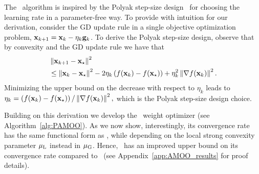The \PAMOO\ algorithm is inspired by the Polyak step-size design~\cite{polyak1987introduction, hazan2019revisiting} for choosing the learning rate in a parameter-free way. To provide with intuition for our derivation, consider the GD update rule in a single objective optimization problem, ${\mathbf{x}}_{k+1}={\mathbf{x}}_k-\eta_k {\mathbf{g}}_k$. To derive the Polyak step-size design, observe that by convexity and the GD update rule we have that
\begin{align}
    &\left\Vert{\mathbf{x}}_{k+1}-{\mathbf{x}}_\star\right\Vert^2 \label{eq:polyak standard main paper}\\
    &\leq \left\Vert{\mathbf{x}}_{k}-{\mathbf{x}}_\star\right\Vert^2 -2 \eta_k \left(f({\mathbf{x}}_k)-f({\mathbf{x}}_\star)\right) + \eta_k^2\left\Vert\nabla f({\mathbf{x}}_k)\right\Vert^2. \nonumber
\end{align}
Minimizing the upper bound on the decrease with respect to $\eta_k$ leads to $\eta_k = \left(f({\mathbf{x}}_k)-f({\mathbf{x}}_\star)\right)/\left\Vert\nabla f({\mathbf{x}}_k)\right\Vert^2,$ which is the Polyak step-size design choice. 

 Building on this derivation we develop the \PAMOO\ weight optimizer (see Algorithm~\ref{alg:PAMOO}). As we now show, interestingly, its convergence rate has the same functional form as \CAMOO, while depending on the local strong convexity parameter ${\mu_{\mathrm{L}}}$ instead in ${\mu_{\mathrm{G}}}$. Hence, \PAMOO\ has an improved upper bound on its convergence rate compared to \CAMOO\ (see Appendix~\ref{app:AMOO_results} for proof details). 


